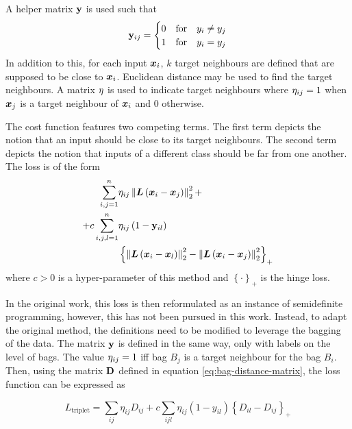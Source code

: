 A helper matrix \( \mathbf{y} \) is used such that
\[ \mathbf{y}_{ij} = \begin{cases}
	0 &\text{for} \quad y_i \neq y_j \\
	1 &\text{for} \quad y_i = y_j \\
\end{cases} \]
In addition to this, for each input \( \bm{x}_i \), \( k \) target neighbours are defined that are supposed to be close to \( \bm{x}_i \). Euclidean distance may be used to find the target neighbours. A matrix \( \mathbf{\eta} \) is used to indicate target neighbours where \( \mathbf{\eta}_{ij} = 1 \) when \( \bm{x}_j \) is a target neighbour of \( \bm{x}_i \) and \( 0 \) otherwise.

The cost function features two competing terms. The first term depicts the notion that an input should be close to its target neighbours. The second term depicts the notion that inputs of a different class should be far from one another. The loss is of the form
\begin{align*}
	\sum_{i, j = 1}^n &\mathbf{\eta}_{ij} \left\lVert \bm{L} \left( \bm{x}_i - \bm{x}_j \right) \right\rVert_2^2 + \\
	+ c \sum_{i, j, l = 1}^n  &\mathbf{\eta}_{ij} \left( 1 - \mathbf{y}_{il} \right) \\
	&\left\{ \left\lVert \bm{L} \left( \bm{x}_i - \bm{x}_l \right) \right\rVert_2^2 - \left\lVert \bm{L} \left( \bm{x}_i - \bm{x}_j \right) \right\rVert_2^2 \right\}_+
\end{align*}
where \( c > 0 \) is a hyper-parameter of this method and \( \left\{ \cdot \right\}_+ \) is the hinge loss.

In the original work, this loss is then reformulated as an instance of semidefinite programming, however, this has not been pursued in this work. Instead, to adapt the original method, the definitions need to be modified to leverage the bagging of the data. The matrix \( \mathbf{y} \) is defined in the same way, only with labels on the level of bags. The value \( \mathbf{\eta}_{ij} = 1 \) iff bag \( B_j \) is a target neighbour for the bag \( B_i \). Then, using the matrix \( \mathbf{D} \) defined in equation \ref{eq:bag-distance-matrix}, the loss function can be expressed as

\[ L_\mathrm{triplet} = \sum_{ij} \eta_{ij} D_{ij} + c \sum_{ijl} \eta_{ij} \left( 1 - y_{il} \right) \left\{ D_{il} - D_{ij} \right\}_+ \]

